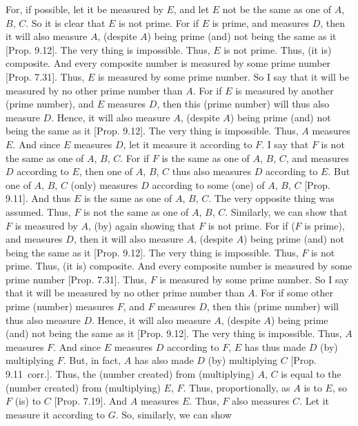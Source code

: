 \begin{Parallel}{}{}
{For, if possible, let it be measured by $E$, and let $E$ not be
the same as one of $A$, $B$, $C$. So it is clear that $E$ is not prime. 
For if $E$ is prime, and measures $D$, then it will also measure $A$, (despite $A$) being prime (and) not being  the same as it [Prop. 9.12]. The very thing is impossible. Thus, $E$
is not prime. Thus, (it is) composite. And every composite
number is measured by some prime number [Prop. 7.31]. Thus, $E$ is measured by some prime number. So I say that it will be measured by no other prime number than $A$.
For if $E$ is measured by another (prime number), and $E$ measures $D$, then this (prime number) will thus also measure $D$. Hence, it will also
measure $A$,  (despite $A$) being prime (and) not being  the same as it [Prop. 9.12]. The very thing is impossible. Thus,
$A$ measures $E$. And since $E$ measures $D$, let it measure it according to $F$. I say that $F$ is not the same as one of $A$, $B$, $C$. For if $F$ is
the same as one of $A$, $B$, $C$, and measures $D$ according to $E$,
then one of $A$, $B$, $C$ thus also measures $D$ according to $E$.
But one of $A$, $B$, $C$ (only) measures $D$ according to some (one) of
$A$, $B$, $C$
[Prop. 9.11]. And thus $E$ is the same as one of
$A$, $B$, $C$. The very opposite thing was assumed. Thus, $F$ is not the
same as one of $A$, $B$, $C$. Similarly, we can show that $F$ is measured by $A$,  (by) again showing that $F$ is not prime. For if ($F$ is prime), and measures $D$,  then it will also measure $A$, (despite $A$) being prime (and) not being  the same as it [Prop. 9.12]. The very thing
is impossible. Thus, $F$ is not prime. Thus, (it is) composite.  And every composite
number is measured by some prime number [Prop. 7.31]. Thus, $F$ is measured by some prime
number. So I say that it will be measured by no other prime number than $A$.
For if  some other prime (number) measures $F$, and $F$ measures $D$, then this (prime number) will thus also measure $D$.  Hence, it will also
measure $A$,  (despite $A$) being prime (and) not being  the same as it [Prop. 9.12]. The very thing is impossible.
Thus, $A$ measures $F$. And since $E$ measures $D$ according to 
$F$, $E$ has thus made $D$ (by) multiplying $F$.  But, in fact, $A$ has
also made $D$ (by) multiplying $C$ [Prop. 9.11~corr.]. Thus, the (number created) from (multiplying)
$A$, $C$ is equal to  the (number created) from (multiplying) $E$, $F$. Thus, proportionally, as $A$ is to $E$, so $F$ (is) to $C$ [Prop. 7.19]. And $A$ measures $E$. Thus, $F$ also
measures $C$. Let it
 measure it according to $G$. So, similarly, we can show
}
\end{Parallel}
